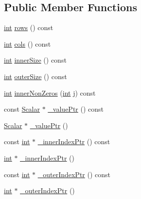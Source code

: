 \subsection*{Public Member Functions}
\begin{DoxyCompactItemize}
\item 
\hyperlink{ioapi_8h_a787fa3cf048117ba7123753c1e74fcd6}{int} \hyperlink{class_mapped_sparse_matrix_a621f699cf53539cffdeb6e1147057cae}{rows} () const 
\item 
\hyperlink{ioapi_8h_a787fa3cf048117ba7123753c1e74fcd6}{int} \hyperlink{class_mapped_sparse_matrix_a95c09c9411049f7f2a6ded6b873b4ea3}{cols} () const 
\item 
\hyperlink{ioapi_8h_a787fa3cf048117ba7123753c1e74fcd6}{int} \hyperlink{class_mapped_sparse_matrix_aea22970b1692db7f9b5decbd5e5b436b}{inner\-Size} () const 
\item 
\hyperlink{ioapi_8h_a787fa3cf048117ba7123753c1e74fcd6}{int} \hyperlink{class_mapped_sparse_matrix_a58c92dbdb6741437d975c1e4be374184}{outer\-Size} () const 
\item 
\hyperlink{ioapi_8h_a787fa3cf048117ba7123753c1e74fcd6}{int} \hyperlink{class_mapped_sparse_matrix_a6e59194f83c81364532aeb540db943ae}{inner\-Non\-Zeros} (\hyperlink{ioapi_8h_a787fa3cf048117ba7123753c1e74fcd6}{int} j) const 
\item 
const \hyperlink{class_sparse_matrix_base_af39d70f2b7e775e9e17b666cd24128c8}{Scalar} $\ast$ \hyperlink{class_mapped_sparse_matrix_a5dde7a340d9079b174396d5d55bdd376}{\-\_\-value\-Ptr} () const 
\item 
\hyperlink{class_sparse_matrix_base_af39d70f2b7e775e9e17b666cd24128c8}{Scalar} $\ast$ \hyperlink{class_mapped_sparse_matrix_a37d6ebb00183db30771ed90f2529e27e}{\-\_\-value\-Ptr} ()
\item 
const \hyperlink{ioapi_8h_a787fa3cf048117ba7123753c1e74fcd6}{int} $\ast$ \hyperlink{class_mapped_sparse_matrix_a86d6529c0166e3781e368c1a77193c0f}{\-\_\-inner\-Index\-Ptr} () const 
\item 
\hyperlink{ioapi_8h_a787fa3cf048117ba7123753c1e74fcd6}{int} $\ast$ \hyperlink{class_mapped_sparse_matrix_aa77b7555b73211575491ce2d07757a1c}{\-\_\-inner\-Index\-Ptr} ()
\item 
const \hyperlink{ioapi_8h_a787fa3cf048117ba7123753c1e74fcd6}{int} $\ast$ \hyperlink{class_mapped_sparse_matrix_a6de6916aa25efabee4f33ebf43f55744}{\-\_\-outer\-Index\-Ptr} () const 
\item 
\hyperlink{ioapi_8h_a787fa3cf048117ba7123753c1e74fcd6}{int} $\ast$ \hyperlink{class_mapped_sparse_matrix_ac2fbb726b523fd65ddba5bf63e46c817}{\-\_\-outer\-Index\-Ptr} ()

\end{DoxyCompactItemize}
